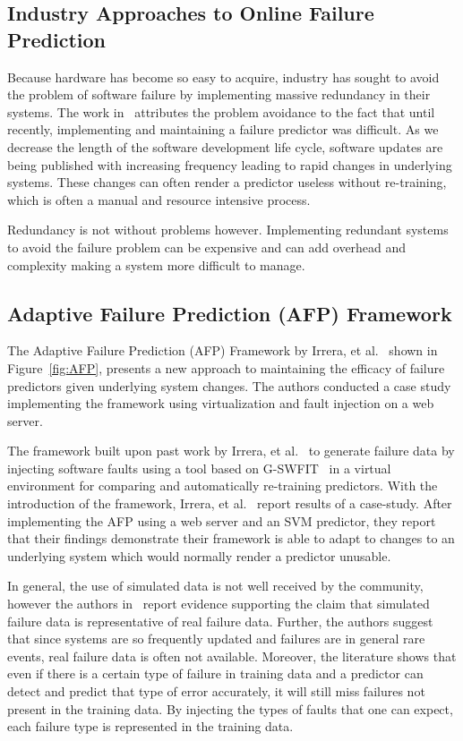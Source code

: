\subsection{Industry Approaches to Online Failure Prediction} \label{industry}
Because hardware has become so easy to acquire, industry has sought to avoid
the problem of software failure by implementing massive redundancy in their
systems.  The work in~\cite{watanabe2014,irrera2015} attributes the problem
avoidance to the fact that until recently, implementing and maintaining a
failure predictor was difficult.  As we decrease the length of the software
development life cycle, software updates are being published with increasing
frequency leading to rapid changes in underlying systems.  These changes can
often render a predictor useless without re-training, which is often a manual
and resource intensive process.

Redundancy is not without problems however.  Implementing redundant systems to
avoid the failure problem can be expensive and can add overhead and complexity
making a system more difficult to manage.

\subsection{Adaptive Failure Prediction (AFP) Framework} \label{afp}
The Adaptive Failure Prediction (AFP) Framework by Irrera, et
al.~\cite{irrera2015} shown in Figure~\ref{fig:AFP}, presents a new approach to
maintaining the efficacy of failure predictors given underlying system changes.
The authors conducted a case study implementing the framework using
virtualization and fault injection on a web server.  

\figAFP{5in}

The framework built upon past work by Irrera, et
al.~\cite{irrera2013,irrera2014} to generate failure data by injecting software
faults using a tool based on G-SWFIT~\cite{gswfit} in a virtual environment for
comparing and automatically re-training predictors.  With the introduction of
the framework, Irrera, et al.~\cite{irrera2015} report results of a case-study.
After implementing the AFP using a web server and an SVM predictor, they report
that their findings demonstrate their framework is able to adapt to changes to
an underlying system which would normally render a predictor unusable.

In general, the use of simulated data is not well received by the community,
however the authors in~\cite{irrera2010,irrera2014} report evidence supporting
the claim that simulated failure data is representative of real failure data.
Further, the authors suggest that since systems are so frequently updated and
failures are in general rare events, real failure data is often not available.
Moreover, the literature shows that even if there is a certain type of failure
in training data and a predictor can detect and predict that type of error
accurately, it will still miss failures not present in the training data.  By
injecting the types of faults that one can expect, each failure type is
represented in the training data.

